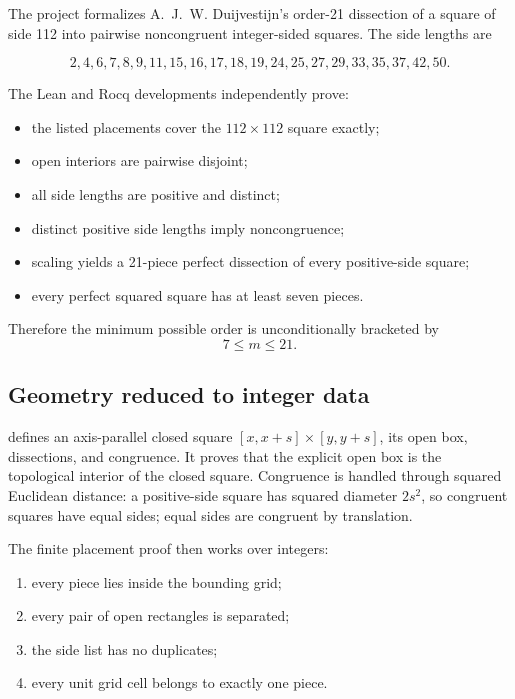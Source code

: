 \documentclass[
  10pt,
  a4paper,
  twoside,
  open=any,
  parskip=half,
  headings=big
]{scrreprt}
\newcommand{\code}[1]{\texttt{\detokenize{#1}}}
\begin{document}
The project formalizes A.~J.~W. Duijvestijn's order-21 dissection of a square
of side 112 into pairwise noncongruent integer-sided squares.  The side lengths
are

\[
2,4,6,7,8,9,11,15,16,17,18,19,24,25,27,29,33,35,37,42,50.
\]

The Lean and Rocq developments independently prove:

\begin{itemize}
  \item the listed placements cover the \(112\times112\) square exactly;
  \item open interiors are pairwise disjoint;
  \item all side lengths are positive and distinct;
  \item distinct positive side lengths imply noncongruence;
  \item scaling yields a 21-piece perfect dissection of every positive-side
        square;
  \item every perfect squared square has at least seven pieces.
\end{itemize}

Therefore the minimum possible order is unconditionally bracketed by
\[
  7 \leq m \leq 21.
\]

\subsection{Geometry reduced to integer data}

\code{Basic.lean} defines an axis-parallel closed square
\([x,x+s]\times[y,y+s]\), its open box, dissections, and congruence.  It proves
that the explicit open box is the topological interior of the closed square.
Congruence is handled through squared Euclidean distance: a positive-side
square has squared diameter \(2s^2\), so congruent squares have equal sides;
equal sides are congruent by translation.

The finite placement proof then works over integers:

\begin{enumerate}
  \item every piece lies inside the bounding grid;
  \item every pair of open rectangles is separated;
  \item the side list has no duplicates;
  \item every unit grid cell belongs to exactly one piece.
\end{enumerate}
\end{document}
